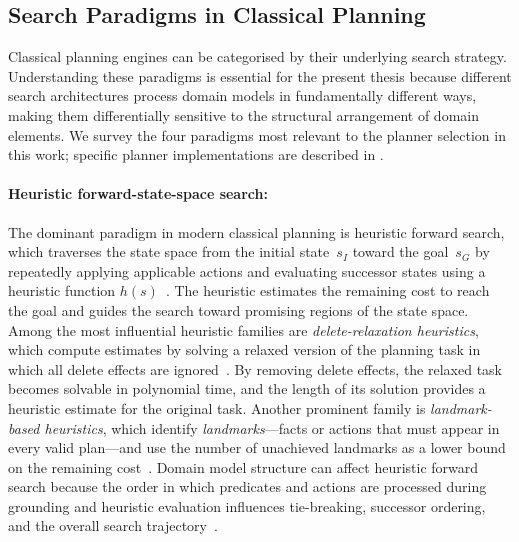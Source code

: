 \subsection{Search Paradigms in Classical Planning}
\label{sec:bg:search_paradigms}

Classical planning engines can be categorised by their underlying search strategy.
Understanding these paradigms is essential for the present thesis because different search architectures process domain models in fundamentally different ways, making them differentially sensitive to the structural arrangement of domain elements.
We survey the four paradigms most relevant to the planner selection in this work; specific planner implementations are described in .

\paragraph{Heuristic forward-state-space search:}
The dominant paradigm in modern classical planning is heuristic forward search, which traverses the state space from the initial state~$s_I$ toward the goal~$s_G$ by repeatedly applying applicable actions and evaluating successor states using a heuristic function $h(s)$~\cite{BonetGeffner2001}.
The heuristic estimates the remaining cost to reach the goal and guides the search toward promising regions of the state space.
Among the most influential heuristic families are \emph{delete-relaxation heuristics}, which compute estimates by solving a relaxed version of the planning task in which all delete effects are ignored~\cite{HoffmannNebel2001, BonetGeffner2001}.
By removing delete effects, the relaxed task becomes solvable in polynomial time, and the length of its solution provides a heuristic estimate for the original task.
Another prominent family is \emph{landmark-based heuristics}, which identify \emph{landmarks}---facts or actions that must appear in every valid plan---and use the number of unachieved landmarks as a lower bound on the remaining cost~\cite{RichterWestphal2010}.
Domain model structure can affect heuristic forward search because the order in which predicates and actions are processed during grounding and heuristic evaluation influences tie-breaking, successor ordering, and the overall search trajectory~\cite{Vallati2021}.

